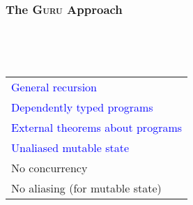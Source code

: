 \documentclass[11pt]{beamer}
\begin{document}
\begin{frame}
  \frametitle{The \textsc{Guru} Approach}

\begin{center}

\ 

\ \ \ \ \ \ \ \ \ \ \ \ \ \ \ \ \ \ \ 
\begin{tabular}{l}
\textcolor{blue}{General recursion} \\
\textcolor{blue}{Dependently typed programs} \\
\textcolor{blue}{External theorems about programs }\\
\textcolor{blue}{Unaliased mutable state} \\
No concurrency \\ 
No aliasing (for mutable state)
\end{tabular}

\end{center}

\end{frame}
\end{document}
